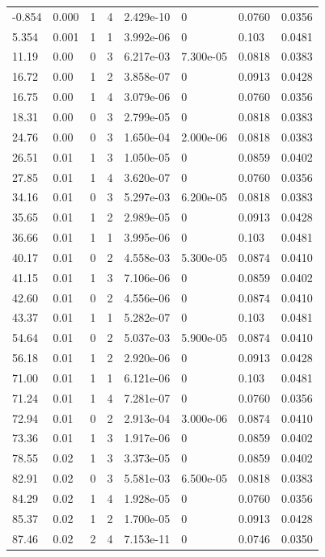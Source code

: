 \documentclass[preview]{standalone}
\begin{document}
{{\begin{tabular}{L{1.2cm}C{1.2cm} C{0.3cm}C{0.5cm} C{1.4cm}C{1.4cm} C{1.4cm}C{1.4cm}}
  -0.854  &  0.000  & 1     &  4 &  2.429e-10  & 0  & 0.0760 &  0.0356   \\ 
  5.354  &  0.001  & 1     &  1 &  3.992e-06  & 0  & 0.103 &  0.0481   \\ 
  11.19  &  0.00  & 0     &  3 &  6.217e-03  & 7.300e-05  & 0.0818 &  0.0383   \\ 
  16.72  &  0.00  & 1     &  2 &  3.858e-07  & 0  & 0.0913 &  0.0428   \\ 
  16.75  &  0.00  & 1     &  4 &  3.079e-06  & 0  & 0.0760 &  0.0356   \\ 
  18.31  &  0.00  & 0     &  3 &  2.799e-05  & 0  & 0.0818 &  0.0383   \\ 
  24.76  &  0.00  & 0     &  3 &  1.650e-04  & 2.000e-06  & 0.0818 &  0.0383   \\ 
  26.51  &  0.01  & 1     &  3 &  1.050e-05  & 0  & 0.0859 &  0.0402   \\ 
  27.85  &  0.01  & 1     &  4 &  3.620e-07  & 0  & 0.0760 &  0.0356   \\ 
  34.16  &  0.01  & 0     &  3 &  5.297e-03  & 6.200e-05  & 0.0818 &  0.0383   \\ 
  35.65  &  0.01  & 1     &  2 &  2.989e-05  & 0  & 0.0913 &  0.0428   \\ 
  36.66  &  0.01  & 1     &  1 &  3.995e-06  & 0  & 0.103 &  0.0481   \\ 
  40.17  &  0.01  & 0     &  2 &  4.558e-03  & 5.300e-05  & 0.0874 &  0.0410   \\ 
  41.15  &  0.01  & 1     &  3 &  7.106e-06  & 0  & 0.0859 &  0.0402   \\ 
  42.60  &  0.01  & 0     &  2 &  4.556e-06  & 0  & 0.0874 &  0.0410   \\ 
  43.37  &  0.01  & 1     &  1 &  5.282e-07  & 0  & 0.103 &  0.0481   \\ 
  54.64  &  0.01  & 0     &  2 &  5.037e-03  & 5.900e-05  & 0.0874 &  0.0410   \\ 
  56.18  &  0.01  & 1     &  2 &  2.920e-06  & 0  & 0.0913 &  0.0428   \\ 
  71.00  &  0.01  & 1     &  1 &  6.121e-06  & 0  & 0.103 &  0.0481   \\ 
  71.24  &  0.01  & 1     &  4 &  7.281e-07  & 0  & 0.0760 &  0.0356   \\ 
  72.94  &  0.01  & 0     &  2 &  2.913e-04  & 3.000e-06  & 0.0874 &  0.0410   \\ 
  73.36  &  0.01  & 1     &  3 &  1.917e-06  & 0  & 0.0859 &  0.0402   \\ 
  78.55  &  0.02  & 1     &  3 &  3.373e-05  & 0  & 0.0859 &  0.0402   \\ 
  82.91  &  0.02  & 0     &  3 &  5.581e-03  & 6.500e-05  & 0.0818 &  0.0383   \\ 
  84.29  &  0.02  & 1     &  4 &  1.928e-05  & 0  & 0.0760 &  0.0356   \\ 
  85.37  &  0.02  & 1     &  2 &  1.700e-05  & 0  & 0.0913 &  0.0428   \\ 
  87.46  &  0.02  & 2     &  4 &  7.153e-11  & 0  & 0.0746 &  0.0350   \\ 
\hline 
\end{tabular} 

}}
\end{document}

